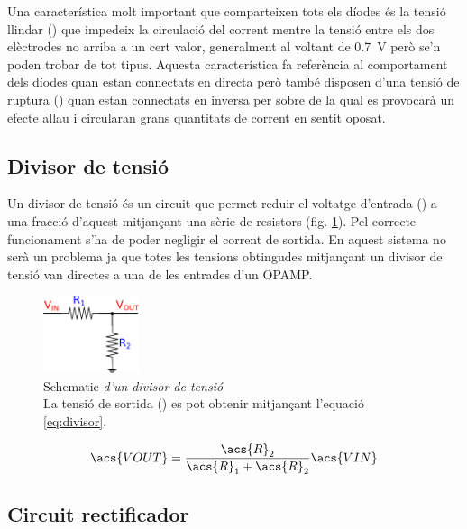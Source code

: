 Una característica molt important que comparteixen tots els díodes és la tensió llindar () que impedeix la circulació del corrent mentre la tensió entre els dos elèctrodes no arriba a un cert valor, generalment al voltant de \SI{0.7}{\volt} però se'n poden trobar de tot tipus. Aquesta característica fa referència al comportament dels díodes quan estan connectats en directa però també disposen d'una tensió de ruptura () quan estan connectats en inversa per sobre de la qual es provocarà un efecte allau i circularan grans quantitats de corrent en sentit oposat.

\subsection{Divisor de tensió}\label{subsec:divisor_tensio}

Un divisor de tensió és un circuit que permet reduir el voltatge d'entrada () a una fracció d'aquest mitjançant una sèrie de resistors (fig. \ref{fig:schematic_divisor_tensio}). Pel correcte funcionament s'ha de poder negligir el corrent de sortida. En aquest sistema no serà un problema ja que totes les tensions obtingudes mitjançant un divisor de tensió van directes a una de les entrades d'un \ac{OPAMP}.

\begin{figure}[htp]
	\centering
	\includegraphics[width=0.25\textwidth]{Figures/schematic_divisor_tensio.pdf}
	\caption[Divisor de tensió]{Schematic\textit{ d'un divisor de tensió}\\{\footnotesize La tensió de sortida () es pot obtenir mitjançant l'equació \ref{eq:divisor}.}}
	\label{fig:schematic_divisor_tensio}
\end{figure}

\begin{equation}\label{eq:divisor}
	\acs{VOUT} = \frac{\acs{R}_{2}}{\acs{R}_{1} + \acs{R}_{2}}\acs{VIN}
\end{equation}

\subsection{Circuit rectificador}\label{subsec:circuit_rectificador}

